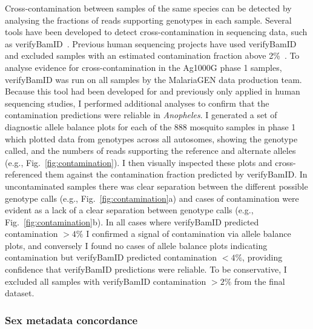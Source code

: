 \documentclass[a4paper,11pt,abstracton,hidelinks]{scrartcl}
\begin{document}
Cross-contamination between samples of the same species can be detected by analysing the fractions of reads supporting genotypes in each sample.
%
Several tools have been developed to detect cross-contamination in sequencing data, such as verifyBamID~\parencite{Jun2012}.
%
Previous human sequencing projects have used verifyBamID and excluded samples with an estimated contamination fraction above 2\%~\parencite{1000G2015}.
%
To analyse evidence for cross-contamination in the Ag1000G phase 1 samples, verifyBamID was run on all samples by the MalariaGEN data production team.
%
Because this tool had been developed for and previously only applied in human sequencing studies, I performed additional analyses to confirm that the contamination predictions were reliable in \textit{Anopheles}.
%
I generated a set of diagnostic allele balance plots for each of the 888 mosquito samples in phase 1 which plotted data from genotypes across all autosomes, showing the genotype called, and the numbers of reads supporting the reference and alternate alleles (e.g., Fig.~\ref{fig:contamination}).
%
I then visually inspected these plots and cross-referenced them against the contamination fraction predicted by verifyBamID.
%
In uncontaminated samples there was clear separation between the different possible genotype calls (e.g., Fig.~\ref{fig:contamination}a) and cases of contamination were evident as a lack of a clear separation between genotype calls (e.g., Fig.~\ref{fig:contamination}b).
%
In all cases where verifyBamID predicted contamination $>4\%$ I confirmed a signal of contamination via allele balance plots, and conversely I found no cases of allele balance plots indicating contamination but verifyBamID predicted contamination $<4\%$, providing confidence that verifyBamID predictions were reliable. 
%
To be conservative, I excluded all samples with verifyBamID contamination $>2\%$ from the final dataset.
%


\subsubsection{Sex metadata concordance}
\end{document}
